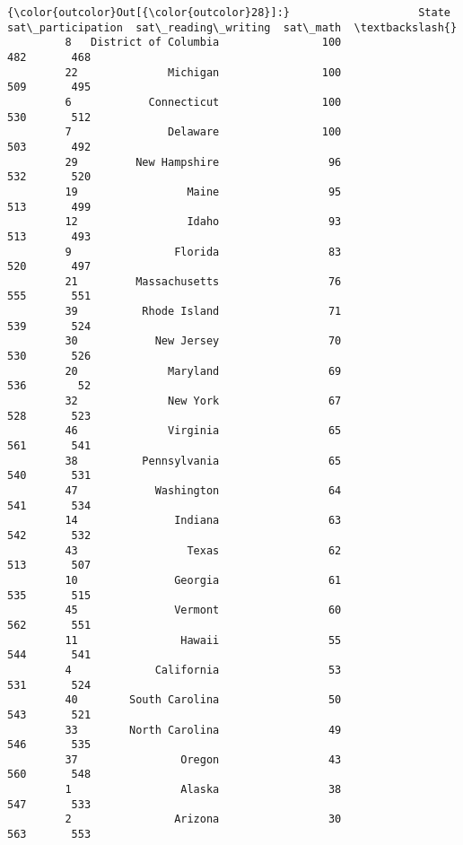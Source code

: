 \documentclass[11pt]{article}
\begin{document}
\begin{Verbatim}[commandchars=\\\{\}]
{\color{outcolor}Out[{\color{outcolor}28}]:}                    State  sat\_participation  sat\_reading\_writing  sat\_math  \textbackslash{}
         8   District of Columbia                100                  482       468   
         22              Michigan                100                  509       495   
         6            Connecticut                100                  530       512   
         7               Delaware                100                  503       492   
         29         New Hampshire                 96                  532       520   
         19                 Maine                 95                  513       499   
         12                 Idaho                 93                  513       493   
         9                Florida                 83                  520       497   
         21         Massachusetts                 76                  555       551   
         39          Rhode Island                 71                  539       524   
         30            New Jersey                 70                  530       526   
         20              Maryland                 69                  536        52   
         32              New York                 67                  528       523   
         46              Virginia                 65                  561       541   
         38          Pennsylvania                 65                  540       531   
         47            Washington                 64                  541       534   
         14               Indiana                 63                  542       532   
         43                 Texas                 62                  513       507   
         10               Georgia                 61                  535       515   
         45               Vermont                 60                  562       551   
         11                Hawaii                 55                  544       541   
         4             California                 53                  531       524   
         40        South Carolina                 50                  543       521   
         33        North Carolina                 49                  546       535   
         37                Oregon                 43                  560       548   
         1                 Alaska                 38                  547       533   
         2                Arizona                 30                  563       553   

\end{Verbatim}
\end{document}
